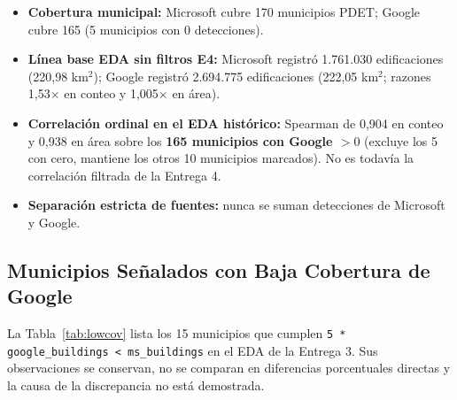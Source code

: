 \documentclass[11pt, a4paper]{article}
\begin{document}
\begin{itemize}
    \item \textbf{Cobertura municipal:} Microsoft cubre 170 municipios PDET; Google cubre 165 (5 municipios con 0 detecciones).
    \item \textbf{Línea base EDA sin filtros E4:} Microsoft registró 1.761.030 edificaciones (220,98 km$^2$); Google registró 2.694.775 edificaciones (222,05 km$^2$; razones 1,53$\times$ en conteo y 1,005$\times$ en área).
    \item \textbf{Correlación ordinal en el EDA histórico:} Spearman de 0,904 en conteo y 0,938 en área sobre los \textbf{165 municipios con Google $> 0$} (excluye los 5 con cero, mantiene los otros 10 municipios marcados). No es todavía la correlación filtrada de la Entrega 4.
    \item \textbf{Separación estricta de fuentes:} nunca se suman detecciones de Microsoft y Google.
\end{itemize}

\subsection{Municipios Señalados con Baja Cobertura de Google}

La Tabla~\ref{tab:lowcov} lista los 15 municipios que cumplen \texttt{5 * google\_buildings < ms\_buildings} en el EDA de la Entrega 3. Sus observaciones se conservan, no se comparan en diferencias porcentuales directas y la causa de la discrepancia no está demostrada.
\end{document}
